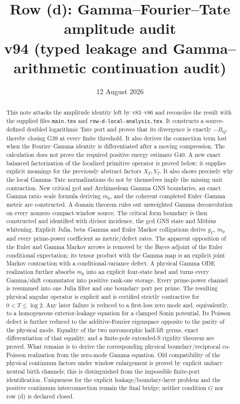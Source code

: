 \documentclass[11pt]{article}
\title{Row (d): Gamma--Fourier--Tate amplitude audit\\
v94 (typed leakage and Gamma--arithmetic continuation audit)}
\author{}
\date{12 August 2026}
\begin{document}
\maketitle

\begin{abstract}
This note attacks the amplitude identity left by v83--v86 and reconciles the
result with the supplied files \texttt{main.tex} and
\texttt{row-d-local-analysis.tex}.  It constructs a
source-defined doubled logarithmic Tate port and proves that its divergence is
exactly $-B_Q$, thereby closing G39 at every finite threshold.  It also derives
the connection term lost when the Fourier--Gamma identity is differentiated
after a moving compression.  The calculation does not prove the required
positive energy estimate G40.  A new exact balanced factorization of the
localized primitive operator is proved below; it supplies explicit meanings
for the previously abstract factors $X_T,Y_T$.  It also shows precisely why
the local Gamma--Tate normalizations do not by themselves imply the missing
unit contraction.  New critical gcd and Archimedean Gamma GNS boundaries,
an exact Gamma ratio--scale formula deriving $m_0$, and the coherent completed
Euler--Gamma metric are constructed.  A domain theorem rules out unweighted
Gamma deconvolution on every nonzero compact-window source.  The critical
form boundary is then constructed and identified with divisor incidence, the
gcd GNS state and M\"obius whitening.  Explicit Julia, beta--Gamma and Euler
Markov colligations derive $g_\Gamma$, $m_0$ and every prime-power coefficient
as metric/defect rates.  The apparent opposition of the Euler and Gamma
Markov arrows is removed by the Bayes adjoint of the Euler conditional
expectation; its tensor product with the Gamma map is an explicit joint
Markov contraction with a conditional-variance defect.  A physical Gamma ODE realization further absorbs
$m_0$ into an explicit four-state head and turns every Gamma/shift commutator
into positive rank-one storage.  Every prime-power channel is resummed into
one Julia filter and one boundary port per prime.  The resulting physical
angular operator is explicit and is certified strictly contractive for
$0<T\le\log2$.  Any later failure is reduced to a first-loss zero mode and,
equivalently, to a homogeneous exterior-leakage equation for a clamped Sonin
potential.  Its Poisson defect is further reduced to the additive-Fourier
eigenspace opposite to the parity of the physical mode.  Equality of the two
meromorphic half-lift germs, exact differentiation of that equality, and a
finite-pole extended-S rigidity theorem are proved.  What remains is to
derive the corresponding physical boundary/reciprocal co-Poisson realization
from the zero-mode Gamma equation.  Old compatibility of the physical
continuum factors under window enlargement is proved by explicit unitary
neutral birth channels; this is distinguished from the impossible finite-port
identification.  Uniqueness for the explicit leakage/boundary-layer problem
and the positive continuum interconnection remain the final bridge; neither
condition $G$ nor row (d) is declared closed.
\end{abstract}
\end{document}
